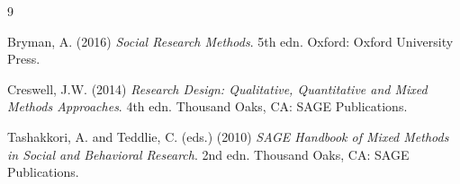 \documentclass[12pt, a4paper]{report}
\begin{document}
\begingroup
\renewcommand{\chapter}[2]{}   %
\begin{thebibliography}{9}

Bryman, A. (2016) \textit{Social Research Methods}. 5th edn. Oxford: Oxford University Press.

Creswell, J.W. (2014) \textit{Research Design: Qualitative, Quantitative and Mixed Methods Approaches}. 4th edn. Thousand Oaks, CA: SAGE Publications.

Tashakkori, A. and Teddlie, C. (eds.) (2010) \textit{SAGE Handbook of Mixed Methods in Social and Behavioral Research}. 2nd edn. Thousand Oaks, CA: SAGE Publications.

\end{thebibliography}
\endgroup

\chapter*{Index}
\printindex
\end{document}
